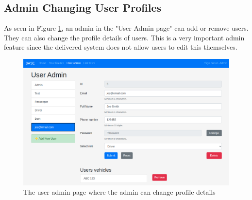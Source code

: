 \documentclass{article}
\begin{document}
\clearpage
\newpage
\subsection{Admin Changing User Profiles}
As seen in Figure \ref{fig:admin_profile_details}, an admin in the "User Admin page" can add or remove users. They can also change the profile details of users. This is a very important admin feature since the delivered system does not allow users to edit this themselves.

\begin{figure}[h!]
    \centering
    \includegraphics[scale=0.40]{ssdFigures/admin_profile_details.png}
    \caption{The user admin page where the admin can change profile details}
    \label{fig:admin_profile_details}
\end{figure}
\end{document}
